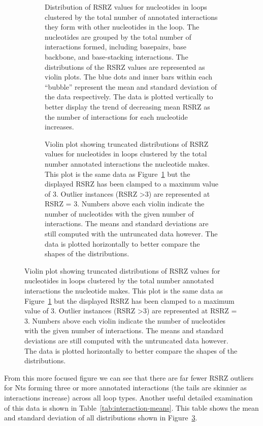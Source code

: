 \begin{figure}
  \begin{subfigure}[b]{0.5\textwidth}
    \caption{Distribution of RSRZ values for nucleotides in loops clustered by
      the total number of annotated interactions they form with other nucleotides
      in the loop. The nucleotides are grouped by the total number of interactions
      formed, including basepairs, base backbone, and base-stacking interactions.
      The distributions of the RSRZ values are represented as violin plots. The
      blue dots and inner bars within each ``bubble'' represent the mean and
      standard deviation of the data respectively. The data is plotted vertically
      to better display the trend of decreasing mean RSRZ as the number of
    interactions for each nucleotide increases. }
    \label{fig:rsrz-dist}
  \end{subfigure}
  \begin{subfigure}[b]{0.5\textwidth}
    \caption{Violin plot showing truncated distributions of RSRZ values for
      nucleotides in loops clustered by the total number annotated interactions
      the nucleotide makes. This plot is the same data as Figure~\ref{fig:rsrz-dist} but
      the displayed RSRZ has been clamped to a maximum value of 3. Outlier
      instances (RSRZ \textgreater 3) are represented at RSRZ = 3. Numbers above each violin
      indicate the number of nucleotides with the given number of interactions.
      The means and standard deviations are still computed with the untruncated
      data however. The data is plotted horizontally to better compare the shapes
    of the distributions.}
    \label{fig:truncated-rsrz-dist}
  \end{subfigure}
\end{figure}

From this more focused figure we can see that there are far fewer RSRZ outliers
for Nts forming three or more annotated interactions (the tails are skinnier as
interactions increase) across all loop types. Another useful detailed
examination of this data is shown in Table~\ref{tab:interaction-means}. This
table shows the mean and standard deviation of all distributions shown in
Figure~\ref{fig:truncated-rsrz-dist}.

